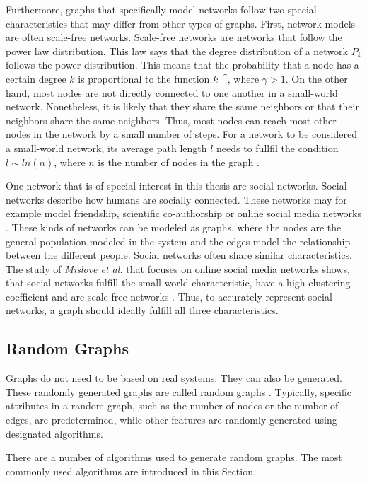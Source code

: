 Furthermore, graphs that specifically model networks follow two special 
characteristics that may differ from other types of graphs.
First, network models are often scale-free networks.
Scale-free networks are networks that follow the power law distribution.
This law says that the degree distribution of a network
$P_k$ follows the power distribution.
This means that the probability that a node has a certain degree $k$ 
is proportional to the function $k^{-\gamma}$, where
$\gamma>1$.
On the other hand, most nodes are not directly
connected to one another in a small-world network.
Nonetheless, it is likely that they share the same neighbors or that their
neighbors share the same neighbors. 
Thus, most nodes can reach most other
nodes in the network by a small number of steps. For a network
to be considered a small-world network, its average path length $l$ 
needs to fullfil the condition $l\sim ln(n)$, where $n$ is the number
of nodes in the graph \cite{wattsmodel}.

One network that is of special interest in this thesis are social networks.
Social networks describe how humans are socially connected. 
These networks may for example model friendship, scientific co-authorship 
or online social media networks \cite{basicnetwork}. 
These kinds of networks can be modeled as graphs, where the nodes 
are the general population modeled in the system
and the edges model the relationship between the 
different people.
Social networks often share similar characteristics. The study of 
\textit{Mislove et al.} that focuses on online social media networks
shows, that social networks fulfill the small world characteristic,
have a high clustering coefficient and are scale-free networks
\cite{mislovesocialnetworkcharacteristics}. Thus, to accurately represent 
social networks, a graph should ideally fulfill all three characteristics.

\subsection{Random Graphs}
\label{randomgraphssection}
Graphs do not need to be based on real systems. They can also be generated. 
These randomly generated graphs are called random graphs \cite{randomgraphs}.
Typically, specific attributes in a random graph, such as the number of nodes 
or the number of edges, are predetermined, 
while other features are randomly generated using designated algorithms.

There are a number of algorithms used to generate random graphs.
The most commonly used algorithms are introduced in this Section.

